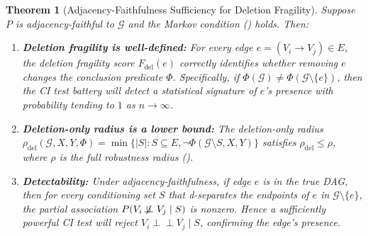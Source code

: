 \documentclass[11pt,a4paper]{article}
\newtheorem{theorem}{Theorem}[section]
\theoremstyle{definition}
\theoremstyle{remark}
\newcommand{\CI}{\perp\!\!\!\perp}
\newcommand{\NCI}{\not\!\perp\!\!\!\perp}
\newcommand{\DAG}{\mathcal{G}}
\newcommand{\fragility}{F}
\newcommand{\radius}{\rho}
\newcommand{\Phi}{\varPhi}
\begin{document}
\begin{theorem}[Adjacency-Faithfulness Sufficiency for Deletion Fragility]\label{thm:adj_faithful}
Suppose $P$ is adjacency-faithful to $\DAG$ and the Markov condition
() holds. Then:
\begin{enumerate}[label=(\alph*)]
  \item \textbf{Deletion fragility is well-defined:} For every edge
    $e = (V_i \to V_j) \in E$, the deletion fragility score
    $\fragility_{\mathrm{del}}(e)$ correctly identifies whether removing $e$
    changes the conclusion predicate $\Phi$. Specifically, if
    $\Phi(\DAG) \neq \Phi(\DAG \setminus \{e\})$, then the CI test
    battery will detect a statistical signature of $e$'s presence with
    probability tending to $1$ as $n \to \infty$.

  \item \textbf{Deletion-only radius is a lower bound:} The deletion-only
    radius $\radius_{\mathrm{del}}(\DAG, X, Y, \Phi) = \min\{|S| : S
    \subseteq E, \neg\Phi(\DAG \setminus S, X, Y)\}$ satisfies
    $\radius_{\mathrm{del}} \leq \radius$, where $\radius$ is the full
    robustness radius ().

  \item \textbf{Detectability:} Under adjacency-faithfulness, if edge $e$
    is in the true DAG, then for every conditioning set $S$ that d-separates
    the endpoints of $e$ in $\DAG \setminus \{e\}$, the partial association
    $P(V_i \NCI V_j \mid S)$ is nonzero. Hence a sufficiently powerful CI
    test will reject $V_i \CI V_j \mid S$, confirming the edge's presence.
\end{enumerate}
\end{theorem}
\end{document}
